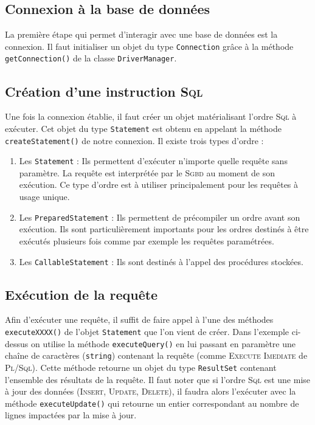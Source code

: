 \documentclass[a4paper,11pt]{article}
\begin{document}
\subsection{Connexion à la base de données}
La première étape qui permet d'interagir avec une base de données est la connexion. Il faut initialiser 
un objet du type \texttt{Connection} grâce à la méthode \texttt{getConnection()} de la classe \texttt{DriverManager}.

\subsection{Création d'une instruction \textsc{Sql}}
Une fois la connexion établie, il faut créer un objet matérialisant l'ordre \textsc{Sql} à exécuter. Cet objet 
du type \texttt{Statement} est obtenu en appelant la méthode \texttt{createStatement()} de notre connexion.
Il existe trois types d'ordre : 
\begin{enumerate}
	\item Les \texttt{Statement} : Ils permettent d'exécuter n'importe quelle requête sans paramètre. La requête est 
	interprétée par le \textsc{Sgbd} au moment de son exécution. Ce type d'ordre est à utiliser principalement 
	pour les requêtes à usage unique.
	\item Les \texttt{PreparedStatement} : Ils permettent de précompiler un ordre avant son exécution. Ils sont 
	particulièrement importants pour les ordres destinés à être exécutés plusieurs fois comme par exemple les 
	requêtes paramétrées.
	\item Les \texttt{CallableStatement} : Ils sont destinés à l'appel des procédures stockées.
\end{enumerate}

\subsection{Exécution de la requête}
Afin d'exécuter une requête, il suffit de faire appel à l'une des méthodes \texttt{executeXXXX()} de l'objet \texttt{Statement} 
que l'on vient de créer. Dans l'exemple ci-dessus on utilise la méthode \texttt{executeQuery()} en lui passant 
en paramètre une chaîne de caractères (\texttt{string}) contenant la requête (comme \textsc{Execute Imediate} 
de \textsc{Pl/Sql}). Cette méthode retourne un objet du type \texttt{ResultSet} contenant l'ensemble des résultats de la 
requête. Il faut noter que si l'ordre \textsc{Sql} est une mise à jour des données (\textsc{Insert}, 
\textsc{Update}, \textsc{Delete}), il faudra alors l'exécuter avec la méthode \texttt{executeUpdate()} qui 
retourne un entier correspondant au nombre de lignes impactées par la mise à jour.
\end{document}

